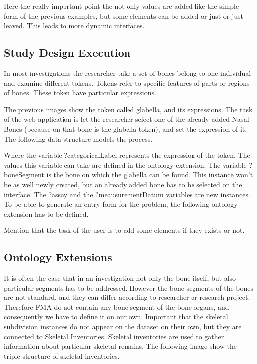 Here the really important point the not only values are added like the simple form of the previous examples, but some elements can be added or just or just leaved. This leads to more dynamic
interfaces.

\subsection{Study Design Execution}




In most investigations the researcher take a set of bones belong to one individual and examine different tokens. Tokens refer to specific features of parts or regions of bones. These token have particular expressions.


The previous images show the token called glabella, and its expressions. The task of the web application is let the researcher select one of the already added Nasal Bones (because on that bone is the glabella token), and set the expression of it. The following data structure models the process.


Where the variable ?categoricalLabel represents the expression of the token. The values this variable can take are defined in the ontology extension. The variable ?boneSegment is the bone on which the glabella can be found. This instance won’t be as well newly created, but an already added bone has to be selected on the interface. The ?assay and the ?meausurementDatum variables are new instances.  To be able to generate an entry form for the problem, the following ontology extension has to be defined.



Mention that the task of the user is to add some elements if they exists or not.


\subsection{Ontology Extensions}

It is often the case that in an investigation not only the bone itself, but also particular segments has to be addressed. However the bone segments of the bones are not standard, and they can differ according to researcher or research project. Therefore FMA do not contain any bone segment of the bone organs, and consequently we have to define it on our own. 
Important that the skeletal subdivision instances do not appear on the dataset on their own, but they are connected to Skeletal Inventories. Skeletal inventories are used to gather information about particular skeletal remains.  The following image show the triple structure of skeletal inventories.

